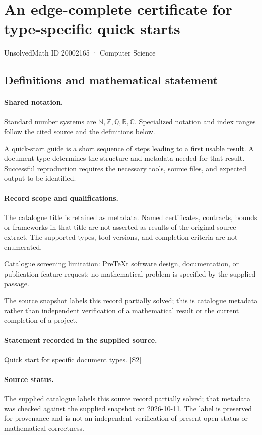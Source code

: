 \documentclass[11pt]{article}
\newcommand{\sref}[2]{\hyperlink{source:#1:#2}{[S#2]}}
\begin{document}
\setcounter{section}{20002164}
\section{An edge-complete certificate for type-specific quick starts}\label{20002165}
{\small\sffamily UnsolvedMath ID 20002165 · Computer Science}
\subsection{Definitions and mathematical statement}

\paragraph{Shared notation.}Standard number systems are $\mathbb N,\mathbb Z,\mathbb Q,\mathbb R,\mathbb C$. Specialized notation and index ranges follow the cited source and the definitions below.


A quick-start guide is a short sequence of steps leading to a first usable result. A document type determines the structure and metadata needed for that result. Successful reproduction requires the necessary tools, source files, and expected output to be identified.
\paragraph{Record scope and qualifications.}
The catalogue title is retained as metadata. Named certificates, contracts, bounds or frameworks in that title are not asserted as results of the original source extract.
The supported types, tool versions, and completion criteria are not enumerated.

Catalogue screening limitation: PreTeXt software design, documentation, or publication feature request; no mathematical problem is specified by the supplied passage.

The source snapshot labels this record partially solved; this is catalogue metadata rather than independent verification of a mathematical result or the current completion of a project.
\paragraph{Statement recorded in the supplied source.}
Quick start for specific document types. \sref{20002165}{2}
\paragraph{Source status.}
The supplied catalogue labels this source record partially solved; that metadata was checked against the supplied snapshot on 2026-10-11. The label is preserved for provenance and is not an independent verification of present open status or mathematical correctness.
\end{document}
